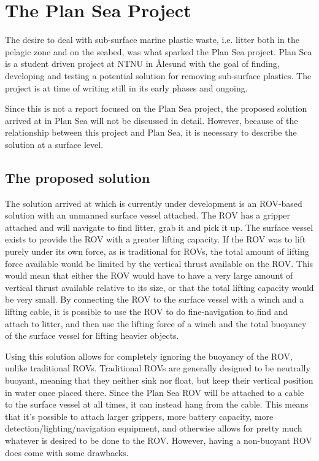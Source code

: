 \section{The Plan Sea Project}
The desire to deal with sub-surface marine plastic waste, i.e. litter both in the pelagic zone and on the seabed, was what sparked the Plan Sea project. Plan Sea is a student driven project at NTNU in Ålesund with the goal of finding, developing and testing a potential solution for removing sub-surface plastics. The project is at time of writing still in its early phases and ongoing. 

Since this is not a report focused on the Plan Sea project, the proposed solution arrived at in Plan Sea will not be discussed in detail. However, because of the relationship between this project and Plan Sea, it is necessary to describe the solution at a surface level. 

\subsection{The proposed solution}
The solution arrived at which is currently under development is an ROV-based solution with an unmanned surface vessel attached. The ROV has a gripper attached and will navigate to find litter, grab it and pick it up. The surface vessel exists to provide the ROV with a greater lifting capacity. If the ROV was to lift purely under its own force, as is traditional for ROVs, the total amount of lifting force available would be limited by the vertical thrust available on the ROV. This would mean that either the ROV would have to have a very large amount of vertical thrust available relative to its size, or that the total lifting capacity would be very small. By connecting the ROV to the surface vessel with a winch and a lifting cable, it is possible to use the ROV to do fine-navigation to find and attach to litter, and then use the lifting force of a winch and the total buoyancy of the surface vessel for lifting heavier objects. 

Using this solution allows for completely ignoring the buoyancy of the ROV, unlike traditional ROVs. Traditional ROVs are generally designed to be neutrally buoyant, meaning that they neither sink nor float, but keep their vertical position in water once placed there. Since the Plan Sea ROV will be attached to a cable to the surface vessel at all times, it can instead hang from the cable. This means that it's possible to attach larger grippers, more battery capacity, more detection/lighting/navigation equipment, and otherwise allows for pretty much whatever is desired to be done to the ROV. However, having a non-buoyant ROV does come with some drawbacks.

